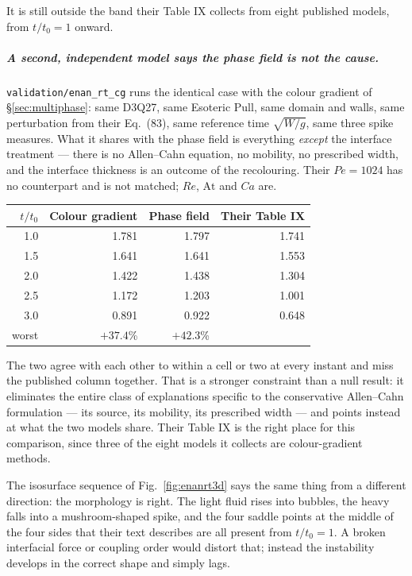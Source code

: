 \documentclass[11pt,a4paper]{article}
\newcommand{\code}[1]{\texttt{\small #1}}
\begin{document}
It is still outside the band their Table IX collects from eight published
models, from $t/t_0=1$ onward.

\subparagraph{A second, independent model says the phase field is not the
cause.} \code{validation/enan\_rt\_cg} runs the identical case with the
colour gradient of \S\ref{sec:multiphase}: same D3Q27, same Esoteric Pull,
same domain and walls, same perturbation from their Eq.~(83), same reference
time $\sqrt{W/g}$, same three spike measures. What it shares with the phase
field is everything \emph{except} the interface treatment --- there is no
Allen--Cahn equation, no mobility, no prescribed width, and the interface
thickness is an outcome of the recolouring. Their $Pe=1024$ has no counterpart
and is not matched; $Re$, $\mathrm{At}$ and $Ca$ are.

\begin{center}
\begin{tabular}{rrrr}
  \toprule
  $t/t_0$ & Colour gradient & Phase field & Their Table IX \\
  \midrule
  1.0 & 1.781 & 1.797 & 1.741 \\
  1.5 & 1.641 & 1.641 & 1.553 \\
  2.0 & 1.422 & 1.438 & 1.304 \\
  2.5 & 1.172 & 1.203 & 1.001 \\
  3.0 & 0.891 & 0.922 & 0.648 \\
  \midrule
  worst & $+37.4$\% & $+42.3$\% & \\
  \bottomrule
\end{tabular}
\end{center}

The two agree with each other to within a cell or two at every instant and
miss the published column together. That is a stronger constraint than a null
result: it eliminates the entire class of explanations specific to the
conservative Allen--Cahn formulation --- its source, its mobility, its
prescribed width --- and points instead at what the two models share. Their
Table IX is the right place for this comparison, since three of the eight
models it collects are colour-gradient methods.

The isosurface sequence of Fig.~\ref{fig:enanrt3d} says the same thing from a
different direction: the morphology is right. The light fluid rises into
bubbles, the heavy falls into a mushroom-shaped spike, and the four saddle
points at the middle of the four sides that their text describes are all
present from $t/t_0=1$. A broken interfacial force or coupling order would
distort that; instead the instability develops in the correct shape and simply
lags.
\end{document}
